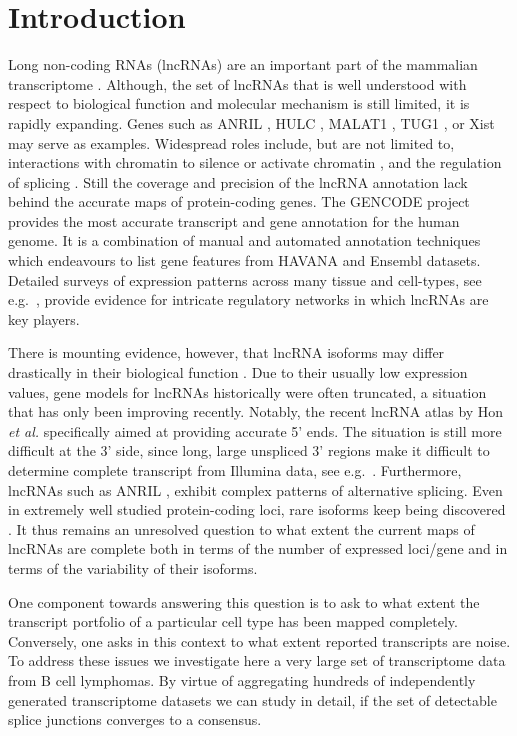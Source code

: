 \documentclass[ncrna,article,submit,moreauthors,pdftex,10pt,a4paper]{mdpi}
\begin{document}
\section{Introduction}

Long non-coding RNAs (lncRNAs) are an important part of the mammalian
transcriptome \cite{Clark:11a,ENCODE:12}. Although, the set of lncRNAs that
is well understood with respect to biological function and molecular
mechanism is still limited, it is rapidly expanding. Genes such as ANRIL
\cite{Li:16A,Aguilo:16}, HULC \cite{Yu:17}, MALAT1 \cite{Liu:17}, TUG1
\cite{Li:16}, or Xist \cite{daRocha:17} may serve as examples. Widespread
roles include, but are not limited to, interactions with chromatin to
silence or activate chromatin \cite{guttmannat2012,Deng:16}, and the
regulation of splicing \cite{Luco:16}. Still the coverage and precision of
the lncRNA annotation lack behind the accurate maps of protein-coding
genes.  The GENCODE project \cite{harrow2012} provides the most accurate
transcript and gene annotation for the human genome. It is a combination of
manual and automated annotation techniques which endeavours to list gene
features from HAVANA and Ensembl datasets. Detailed surveys of expression
patterns across many tissue and cell-types, see e.g.\
\cite{cabili2011,MasPonte:17,Hon:17}, provide evidence for intricate
regulatory networks in which lncRNAs are key players.

There is mounting evidence, however, that lncRNA isoforms may differ
drastically in their biological function \cite{Holdt:13a,Bozgeyik:16}. Due
to their usually low expression values, gene models for lncRNAs
historically were often truncated, a situation that has only been improving
recently.  Notably, the recent lncRNA atlas by Hon \emph{et al.}
\cite{Hon:17} specifically aimed at providing accurate 5' ends. The
situation is still more difficult at the 3' side, since long, large
unspliced 3' regions make it difficult to determine complete transcript from
Illumina data, see e.g.\ \cite{Mercer:10,Engelhardt:15a}. Furthermore,
lncRNAs such as ANRIL \cite{Holdt:13a}, exhibit complex patterns of
alternative splicing. Even in extremely well studied protein-coding loci,
rare isoforms keep being discovered \cite{Hoffmann:14a}. It thus remains an
unresolved question to what extent the current maps of lncRNAs are complete
both in terms of the number of expressed loci/gene and in terms of the
variability of their isoforms.

One component towards answering this question is to ask to what extent the
transcript portfolio of a particular cell type has been mapped completely.
Conversely, one asks in this context to what extent reported transcripts
are noise. To address these issues we investigate here a very large set of
transcriptome data from B cell lymphomas. By virtue of aggregating hundreds
of independently generated transcriptome datasets we can study in detail, if the set of detectable splice junctions converges to a consensus.
\end{document}

